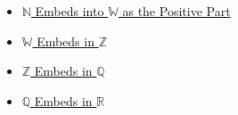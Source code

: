 \begin{dependencies}
\begin{itemize}
  \item \hyperref[thm:n-embeds-into-w-as-positive-part]{$\mathbb{N}$ Embeds into $\mathbb{W}$ as the Positive Part}
  \item \hyperref[thm:w-embeds-in-z]{$\mathbb{W}$ Embeds in $\mathbb{Z}$}
  \item \hyperref[thm:z-embeds-in-q]{$\mathbb{Z}$ Embeds in $\mathbb{Q}$}
  \item \hyperref[thm:q-embeds-in-r]{$\mathbb{Q}$ Embeds in $\mathbb{R}$}
\end{itemize}
\end{dependencies}
